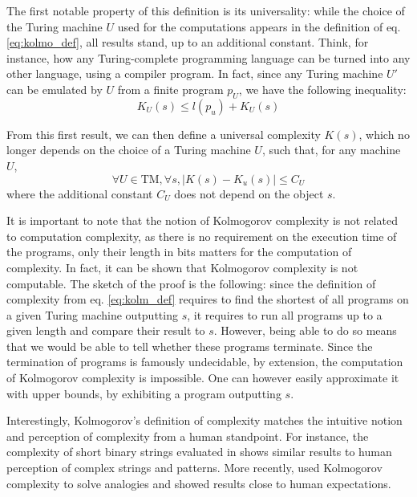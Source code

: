 \documentclass[conference]{IEEEtran}
\begin{document}
The first notable property of this definition is its universality: while the
choice of the Turing machine $U$ used for the computations appears in the
definition of eq. \ref{eq:kolmo_def}, all results stand, up to an additional
constant. Think, for instance, how any Turing-complete programming language can
be turned into any other language, using a compiler program. In fact, since any
Turing machine $U'$ can be emulated by $U$ from a
finite program $p_{U}$, we have the following inequality:
\begin{equation}
  \label{eq:inequality_univ}
  K_{U}(s) \le l(p_{u}) + K_{U}(s)
\end{equation}

From this first result, we can then define a universal complexity $K(s)$, which
no longer depends on the choice of a Turing machine $U$, such that, for any
machine $U$,
\begin{equation}
  \forall U\in\text{TM}, \forall s, |K(s) - K_{u}(s)| \le C_{U}
\end{equation}
where the additional constant $C_{U}$ does not depend on the object $s$.

It is important to note that the notion of Kolmogorov complexity is not related
to computation complexity, as there is no requirement on the execution time
of the programs, only their length in bits matters for the computation of
complexity. In fact, it can be shown that Kolmogorov complexity is not
computable\cite{li_introduction_2008}. The sketch of the proof is the following:
since the definition of complexity from eq. \ref{eq:kolm_def} requires to find
the shortest of all programs on a given Turing machine outputting $s$, it
requires to run all programs up to a given length and compare their result to
$s$. However, being able to do so means that we would be able to tell whether
these programs terminate. Since the termination of programs is famously
undecidable, by extension, the computation of Kolmogorov complexity is
impossible. One can however easily approximate it with upper bounds, by
exhibiting a program outputting $s$.

Interestingly, Kolmogorov's definition of complexity matches the intuitive
notion and perception of complexity from a human standpoint. For instance, the
complexity of short binary strings evaluated in \cite{delahaye_numerical_2012}
shows similar results to human perception of complex strings and patterns. More
recently, \cite{murena_solving_2020} used Kolmogorov complexity to solve
analogies and showed results close to human expectations.
\end{document}
